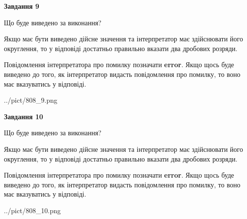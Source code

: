 \documentclass[12pt, ukrainian]{article}
\begin{document}
{\begin {Large}
{\begin {center}\textbf{Завдання 9}\end {center}}\par
Що буде виведено за виконання? \par

Якщо має бути виведено дійсне значення та інтерпретатор має здійснювати його округлення, 
то у відповіді достатньо правильно вказати два дробових розряди.

Повідомлення інтерпретатора про помилку позначати \textbf{error}.
Якщо щось буде виведено до того, як інтерпретатор видасть повідомлення про помилку, 
то воно має вказуватись у відповіді. \par

\begin{center}
	{../pict/808_9.png}
\end{center}
\newpage

{\begin {center}\textbf{Завдання 10}\end {center}}\par
Що буде виведено за виконання? \par

Якщо має бути виведено дійсне значення та інтерпретатор має здійснювати його округлення, 
то у відповіді достатньо правильно вказати два дробових розряди.

Повідомлення інтерпретатора про помилку позначати \textbf{error}.
Якщо щось буде виведено до того, як інтерпретатор видасть повідомлення про помилку, 
то воно має вказуватись у відповіді. \par

\begin{center}
	{../pict/808_10.png}
\end{center}
\newpage

\end {Large}}
\end{document}
